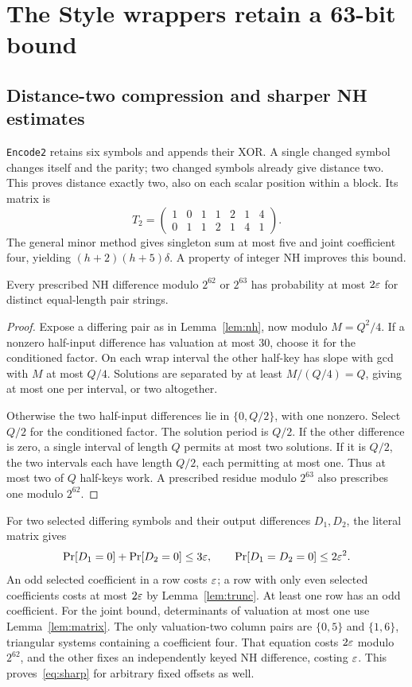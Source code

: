 \section{The Style wrappers retain a 63-bit bound}\label{sec:style}
\subsection{Distance-two compression and sharper NH estimates}
\texttt{Encode2} retains six symbols and appends their XOR. A single changed symbol changes itself and the parity; two changed symbols already give distance two. This proves distance exactly two, also on each scalar position within a block. Its matrix is
\begin{equation}\label{eq:T2}
 T_2=\begin{pmatrix}1&0&1&1&2&1&4\\0&1&1&2&1&4&1\end{pmatrix}.
\end{equation}
The general minor method gives singleton sum at most five and joint coefficient four, yielding $(h+2)(h+5)\delta$. A property of integer NH improves this bound.

\begin{lemma}[Truncated NH]\label{lem:trunc}
Every prescribed NH difference modulo $2^{62}$ or $2^{63}$ has probability at most $2\varepsilon$ for distinct equal-length pair strings.
\end{lemma}
\begin{proof}
Expose a differing pair as in Lemma~\ref{lem:nh}, now modulo $M=Q^2/4$. If a nonzero half-input difference has valuation at most 30, choose it for the conditioned factor. On each wrap interval the other half-key has slope with gcd with $M$ at most $Q/4$. Solutions are separated by at least $M/(Q/4)=Q$, giving at most one per interval, or two altogether.

Otherwise the two half-input differences lie in $\{0,Q/2\}$, with one nonzero. Select $Q/2$ for the conditioned factor. The solution period is $Q/2$. If the other difference is zero, a single interval of length $Q$ permits at most two solutions. If it is $Q/2$, the two intervals each have length $Q/2$, each permitting at most one. Thus at most two of $Q$ half-keys work. A prescribed residue modulo $2^{63}$ also prescribes one modulo $2^{62}$.
\end{proof}

For two selected differing symbols and their output differences $D_1,D_2$, the literal matrix gives
\begin{equation}\label{eq:sharp}
 \mathop{\rm Pr}[D_1=0]+\mathop{\rm Pr}[D_2=0]\le3\varepsilon,\qquad
 \mathop{\rm Pr}[D_1=D_2=0]\le2\varepsilon^2.
\end{equation}
An odd selected coefficient in a row costs $\varepsilon$; a row with only even selected coefficients costs at most $2\varepsilon$ by Lemma~\ref{lem:trunc}. At least one row has an odd coefficient. For the joint bound, determinants of valuation at most one use Lemma~\ref{lem:matrix}. The only valuation-two column pairs are $\{0,5\}$ and $\{1,6\}$, triangular systems containing a coefficient four. That equation costs $2\varepsilon$ modulo $2^{62}$, and the other fixes an independently keyed NH difference, costing $\varepsilon$. This proves~\eqref{eq:sharp} for arbitrary fixed offsets as well.

